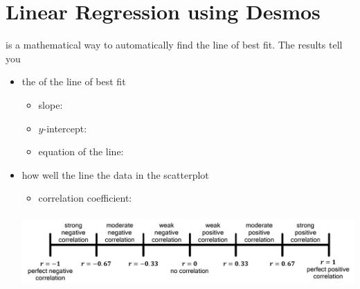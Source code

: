 \section{Linear Regression using {Desmos}}

  is a mathematical way to automatically find the 
line of best fit.
The results tell you 
\begin{itemize}[nosep]
    \item the  of the line of best fit 
        \begin{itemize}[nosep]
            \item slope: 
            \item $y$-intercept:  
            \item equation of the line: 
        \end{itemize}
    \item how well the line  the data in the scatterplot
        \begin{itemize}
            \item correlation coefficient: 
        \end{itemize}
        \begin{center}
            \includegraphics[height=1.1in]{correlation-strengths.png}
        \end{center}
\end{itemize}

